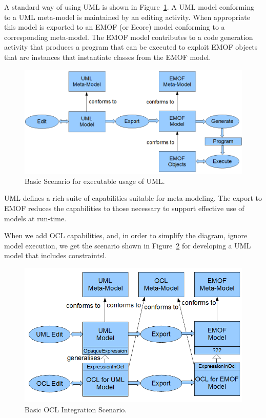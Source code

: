 \documentclass{eceasst}
\begin{document}
A standard way of using UML is shown in Figure~\ref{fig:BasicScenario}. A UML model conforming to a UML meta-model is maintained by an editing activity. When appropriate this model is exported to an EMOF (or Ecore) model conforming to a corresponding meta-model. The EMOF model contributes to a code generation activity that produces a program that can be executed to exploit EMOF objects that are instances that instantiate classes from the EMOF model.

\begin{figure}
  \begin{center}
    \includegraphics[width=5.75in]{BasicScenario.png}
  \end{center}
  \caption{Basic Scenario for executable usage of UML.}
  \label{fig:BasicScenario}
\end{figure}


UML defines a rich suite of capabilities suitable for meta-modeling. The export to EMOF reduces the capabilities to those necessary to support effective use of models at run-time.

When we add OCL capabilities, and, in order to simplify the diagram, ignore model execution, we get the scenario shown in Figure~\ref{fig:BasicOCLScenario} for developing a UML model that includes constraintsl.

\begin{figure}
  \begin{center}
    \includegraphics[width=4.5in]{BasicOCLScenario.png}
  \end{center}
  \caption{Basic OCL Integration Scenario.}
  \label{fig:BasicOCLScenario}
\end{figure}
\end{document}
